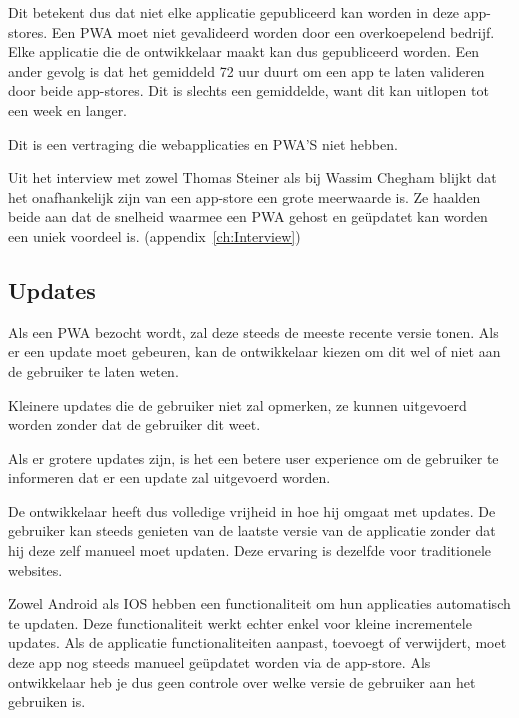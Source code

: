 	Dit betekent dus dat niet elke applicatie gepubliceerd kan worden in deze app-stores. Een PWA moet niet gevalideerd worden door een overkoepelend bedrijf. Elke applicatie die de ontwikkelaar maakt kan dus gepubliceerd worden.
	Een ander gevolg is dat het gemiddeld 72 uur duurt om een app te laten valideren door beide app-stores. Dit is slechts een gemiddelde, want dit kan uitlopen tot een week en langer.
	\autocite{Siddiqui2019}
	
	Dit is een vertraging die webapplicaties en PWA'S niet hebben.
	
	Uit het interview met zowel Thomas Steiner als bij Wassim Chegham blijkt dat het onafhankelijk zijn van een app-store een grote meerwaarde is. Ze haalden beide aan dat de snelheid waarmee een PWA gehost en geüpdatet kan worden een uniek voordeel is.
	(appendix~\ref{ch:Interview})
	
\subsection{Updates}

	Als een PWA bezocht wordt, zal deze steeds de meeste recente versie tonen. Als er een update moet gebeuren, kan de ontwikkelaar kiezen om dit wel of niet aan de gebruiker te laten weten. 	
	\autocite{Hume2018}
	
	Kleinere updates die de gebruiker niet zal opmerken, ze kunnen uitgevoerd worden zonder dat de gebruiker dit weet.
	 \autocite{Sanderson2020}
	 
	Als er grotere updates zijn, is het een betere user experience om de gebruiker te informeren dat er een update zal uitgevoerd worden.
	\autocite{Wicki2017}
	 
	De ontwikkelaar heeft dus volledige vrijheid in hoe hij omgaat met updates. De gebruiker kan steeds genieten van de laatste versie van de applicatie zonder dat hij deze zelf manueel moet updaten. Deze ervaring is dezelfde voor traditionele websites.
	
	Zowel Android als IOS hebben een functionaliteit om hun applicaties automatisch te updaten. Deze functionaliteit werkt echter enkel voor kleine incrementele updates. Als de applicatie functionaliteiten aanpast, toevoegt of verwijdert, moet deze app nog steeds manueel geüpdatet worden via de app-store. Als ontwikkelaar heb je dus geen controle over welke versie de gebruiker aan het gebruiken is.
	\autocite{Apple2020d}
	\autocite{AndroidDevelopers2020}
		

